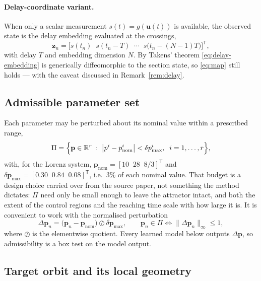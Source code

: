\paragraph{Delay-coordinate variant.}
When only a scalar measurement $s(t)=g(\mathbf{u}(t))$ is available, the
observed state is the delay embedding evaluated at the crossings,
%
\begin{equation}
\mathbf{z}_n=\bigl[s(t_n)\;\;s(t_n-T)\;\;\cdots\;\;s\bigl(t_n-(N-1)T\bigr)\bigr]^{\mathsf T},
\label{eq:delay-embedding}
\end{equation}
%
with delay $T$ and embedding dimension $N$. By Takens' theorem
\eqref{eq:delay-embedding} is generically diffeomorphic to the section state,
so \eqref{eq:map} still holds --- with the caveat discussed in
Remark~\ref{rem:delay}.

\subsection{Admissible parameter set}
\label{subsec:ecr-pi}

Each parameter may be perturbed about its nominal value within a prescribed
range,
%
\begin{equation}
\Pi=\Bigl\{\mathbf{p}\in\mathbb{R}^{r}\;:\;
\bigl|p^{i}-p^{i}_{\mathrm{nom}}\bigr|<\delta p^{i}_{\max},\;\;i=1,\dots,r\Bigr\},
\label{eq:admissible-set}
\end{equation}
%
with, for the Lorenz system,
$\mathbf{p}_{\mathrm{nom}}=[10\;\;28\;\;8/3]^{\mathsf T}$ and
$\delta\mathbf{p}_{\max}=[0.30\;\;0.84\;\;0.08]^{\mathsf T}$, i.e.\ $3\%$ of each
nominal value.  That budget is a design choice carried over from the source
paper, not something the method dictates: $\Pi$ need only be small enough to
leave the attractor intact, and both the extent of the control regions and the
reaching time scale with how large it is.  It is convenient to work with the
normalised perturbation
%
\begin{equation}
\Delta\mathbf{p}_n=\bigl(\mathbf{p}_n-\mathbf{p}_{\mathrm{nom}}\bigr)\oslash\delta\mathbf{p}_{\max},
\qquad
\mathbf{p}_n\in\Pi \iff \|\Delta\mathbf{p}_n\|_{\infty}\le 1 ,
\label{eq:normalised-perturbation}
\end{equation}
%
where $\oslash$ is the elementwise quotient. Every learned model below outputs
$\Delta\mathbf{p}$, so admissibility is a box test on the model output.

\subsection{Target orbit and its local geometry}
\label{subsec:ecr-target}

